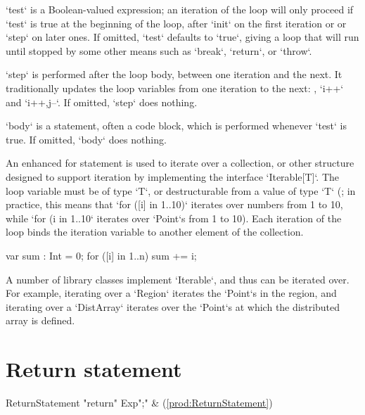 \xcd`test` is a Boolean-valued expression; an iteration of the loop will only
proceed if \xcd`test` is true at the beginning of the loop, after \xcd`init`
on the first iteration or or \xcd`step` on later ones. If omitted, \xcd`test`
defaults to \xcd`true`, giving a loop that will run until stopped by some
other means such as \xcd`break`, \xcd`return`, or \xcd`throw`.

\xcd`step` is performed after the loop body, between one iteration and the
next. It traditionally updates the loop variables from one iteration to the
next: \eg, \xcd`i++` and \xcd`i++,j--`.  If omitted, \xcd`step` does nothing.

\xcd`body` is a statement, often a code block, which is performed whenever
\xcd`test` is true.  If omitted, \xcd`body` does nothing.




\label{ForAllLoop}


An enhanced for statement is used to iterate over a collection, or other
structure designed to support iteration by implementing the interface
\xcd`Iterable[T]`.    The loop variable must be of type \xcd`T`, 
or destructurable from a value of type \xcd`T`
(; in practice, this means that 
\xcd`for ([i] in 1..10)` iterates over numbers from 1 to 10, while 
\xcd`for (i in 1..10` iterates over \xcd`Point`s from 1 to 10).
Each iteration of the loop
binds the iteration variable to another element of the collection.

\begin{xten}
  var sum : Int = 0;
  for ([i] in 1..n) sum += i;
\end{xten}

A number of library classes implement \xcd`Iterable`, and thus can be iterated
over.  For example, iterating over a \xcd`Region` iterates the \xcd`Point`s in
the region, and iterating over a \xcd`DistArray` iterates over the
\xcd`Point`s at which the distributed array is defined.



\section{Return statement}
\label{ReturnStatement}

\begin{bbgrammar}
 ReturnStatement    \: \xcd"return" Exp\opt \xcd";" & (\ref{prod:ReturnStatement})\\%
\end{bbgrammar}


